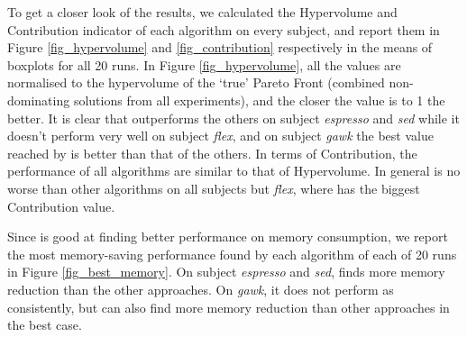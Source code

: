 To get a closer look of the results, we calculated the Hypervolume and Contribution indicator of each algorithm on every subject, and report them in Figure \ref{fig_hypervolume} and \ref{fig_contribution} respectively in the means of boxplots for all 20 runs. 
In Figure \ref{fig_hypervolume}, all the values are normalised to the hypervolume of the `true' Pareto Front (combined non-dominating solutions from all experiments), and the closer the value is to 1 the better. It is clear that \dn{} outperforms the others on subject \emph{espresso} and \emph{sed} while it doesn't perform very well on subject \emph{flex}, and on subject \emph{gawk} the best value reached by \dn{} is better than that of the others.
In terms of Contribution, the performance of all algorithms are similar to that of Hypervolume. In general \dn{} is no worse than other algorithms on all subjects but \emph{flex}, where \sn{} has the biggest Contribution value.


Since \dn{} is good at finding better performance on memory consumption, we report the most memory-saving performance found by each algorithm of each of 20 runs in Figure \ref{fig_best_memory}. On subject \emph{espresso} and \emph{sed}, \dn{} finds more memory reduction than the other approaches. On \emph{gawk}, it does not perform as consistently, but can also find more memory reduction than other approaches in the best case. 

